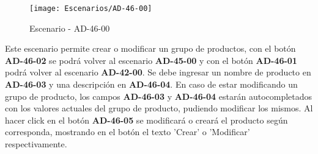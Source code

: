 \begin{figure}[H]
\centering
\texttt{[image: Escenarios/AD-46-00]}
\caption{Escenario - AD-46-00}
\label{fig:AD-46-00}
\end{figure}

Este escenario permite crear o modificar un grupo de productos, con el botón \textbf{AD-46-02} se podrá volver al escenario \textbf{AD-45-00} y con el botón \textbf{AD-46-01} podrá volver al escenario \textbf{AD-42-00}. Se debe ingresar un nombre de producto en \textbf{AD-46-03} y una descripción en \textbf{AD-46-04}. En caso de estar modificando un grupo de producto, los campos \textbf{AD-46-03} y \textbf{AD-46-04} estarán autocompletados con los valores actuales del grupo de producto, pudiendo modificar los mismos. Al hacer click en el botón \textbf{AD-46-05} se modificará o creará el producto según corresponda, mostrando en el botón el texto 'Crear' o 'Modificar' respectivamente.
\clearpage
